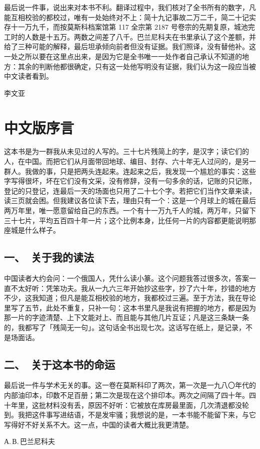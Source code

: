 最后说一件事，说出来对本书不利。翻译过程中，我们核对了全书所有的数字，凡能互相校验的都校过，唯有一处始终对不上：简十九记事故二万二千，简二十记实存十一万九千，而按莫斯科档案馆第 117 全宗第 2187 号卷宗的先期复原，城池完工时的人数是十五万。两数之间差了八千。巴兰尼科夫在书里承认了这个差额，并给了三种可能的解释，最后坦承倾向前者但没有证据。我们照译，没有替他补。这一处之所以要在这里点出来，是因为它是全书唯一一处作者自己承认不知道的地方：其余的判断他都很确定，只有这一处他写明没有证据，我们认为这一段应当被中文读者看到。

\begin{flushright}
{\small 李文亚}
\end{flushright}



\clearpage
\chapter*{中文版序言}

这本书是为一群我从未见过的人写的。三十七片残简上的字，是汉字；读它们的人，在中国。而把它们从月面带回地球、编目、封存、六十年无人过问的，是另一群人。我做的事，只是把两头连起来。连起来之后，我发现一个尴尬的事实：这些字写得很坏，坏在它们没有文采，没有修辞，没有一句多余的话，记账的只记账，登记的只登记，连最后一天的场面也只用了二十七个字。若把它们当作文章来读，读三页就会困。但我建议各位读下去，理由只有一个：这是一个月球上的城在最后两万年里，唯一愿意留给自己的东西。一个有十一万九千人的城，两万年，只留下三十七片，平均五百四十年一片；这个比例本身，比任何一片的内容都更能说明那座城是什么样子。

\section*{一、\ 关于我的读法}

中国读者大约会问：一个俄国人，凭什么读小篆。这个问题我答过很多次，答案一直不太好听：凭笨功夫。我从一九六三年开始抄这些字，抄了六十年，抄错的地方不少，这我知道；但凡是能互相校验的地方，我都校过三遍。至于方法，我在导论里写了五节，此处不重复，只补一句：这本书里凡是我说有把握的地方，都是因为那一片的字迹清楚、上下文能对上、而且能与其他几片互证；凡是这三条缺一条的，我都写了「残简无一句」。这句话全书出现七次。这话写在纸上，是记录，不是场面话。

\section*{二、\ 关于这本书的命运}

最后说一件与学术无关的事。这一卷在莫斯科印了两次，第一次是一九八〇年代的内部油印本，印数不足百册；第二次是现在这个排印本。两次之间隔了四十年。四十年里，这批材料没有丢，原因不好听：它被放在库房最里面，几次清退都没轮到。我把这件事写进结语，不是发牢骚；我想说的是，一本书能不能留下来，与它写得好不好关系不大。这一点，中国的读者大概比我更清楚。

\begin{flushright}
{\small А.\,В.\,巴兰尼科夫}
\end{flushright}
